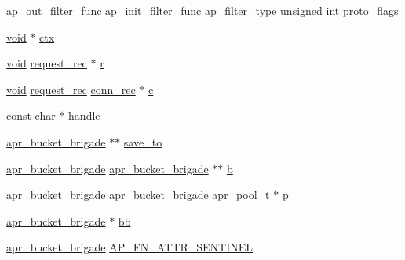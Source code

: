 \begin{DoxyCompactItemize}
\item 
\hyperlink{group__APACHE__CORE__FILTER_ga5c80541a5a1dcc9a383e90aa82be59b3}{ap\+\_\+out\+\_\+filter\+\_\+func} \hyperlink{group__APACHE__CORE__FILTER_ga7ecd47b41aacab276198f6d1fc05a56c}{ap\+\_\+init\+\_\+filter\+\_\+func} \hyperlink{group__APACHE__CORE__FILTER_ga6dc4721ae075c103a3f3a93775d139fa}{ap\+\_\+filter\+\_\+type} unsigned \hyperlink{pcre_8txt_a42dfa4ff673c82d8efe7144098fbc198}{int} \hyperlink{group__APACHE__CORE__FILTER_gaf29b539a8cdc699955f96de76499f780}{proto\+\_\+flags}
\item 
\hyperlink{group__MOD__ISAPI_gacd6cdbf73df3d9eed42fa493d9b621a6}{void} $\ast$ \hyperlink{group__APACHE__CORE__FILTER_ga94af791485570bea922969fef12d6259}{ctx}
\item 
\hyperlink{group__MOD__ISAPI_gacd6cdbf73df3d9eed42fa493d9b621a6}{void} \hyperlink{structrequest__rec}{request\+\_\+rec} $\ast$ \hyperlink{group__APACHE__CORE__FILTER_gaedf2e57576fb94c7e1bbe1ba20df39d4}{r}
\item 
\hyperlink{group__MOD__ISAPI_gacd6cdbf73df3d9eed42fa493d9b621a6}{void} \hyperlink{structrequest__rec}{request\+\_\+rec} \hyperlink{structconn__rec}{conn\+\_\+rec} $\ast$ \hyperlink{group__APACHE__CORE__FILTER_ga29f4e128d2074866812e22a8ccb6b649}{c}
\item 
const char $\ast$ \hyperlink{group__APACHE__CORE__FILTER_ga68ba22c11aa974c2d027851747c98822}{handle}
\item 
\hyperlink{structapr__bucket__brigade}{apr\+\_\+bucket\+\_\+brigade} $\ast$$\ast$ \hyperlink{group__APACHE__CORE__FILTER_ga723cf02e42fc5bf4de0a3e2518407fc1}{save\+\_\+to}
\item 
\hyperlink{structapr__bucket__brigade}{apr\+\_\+bucket\+\_\+brigade} \hyperlink{structapr__bucket__brigade}{apr\+\_\+bucket\+\_\+brigade} $\ast$$\ast$ \hyperlink{group__APACHE__CORE__FILTER_ga8369628ef49e785ad390b376207cfb5e}{b}
\item 
\hyperlink{structapr__bucket__brigade}{apr\+\_\+bucket\+\_\+brigade} \hyperlink{structapr__bucket__brigade}{apr\+\_\+bucket\+\_\+brigade} \hyperlink{structapr__pool__t}{apr\+\_\+pool\+\_\+t} $\ast$ \hyperlink{group__APACHE__CORE__FILTER_ga0a6f92a0aa5e88fe32512197f94440aa}{p}
\item 
\hyperlink{structapr__bucket__brigade}{apr\+\_\+bucket\+\_\+brigade} $\ast$ \hyperlink{group__APACHE__CORE__FILTER_ga0b0eadb381dbe958da483f3d9fc9521a}{bb}
\item 
\hyperlink{structapr__bucket__brigade}{apr\+\_\+bucket\+\_\+brigade} \hyperlink{group__APACHE__CORE__FILTER_ga69055c906cec93f4dfe7338d2f916217}{A\+P\+\_\+\+F\+N\+\_\+\+A\+T\+T\+R\+\_\+\+S\+E\+N\+T\+I\+N\+EL}
\end{DoxyCompactItemize}
